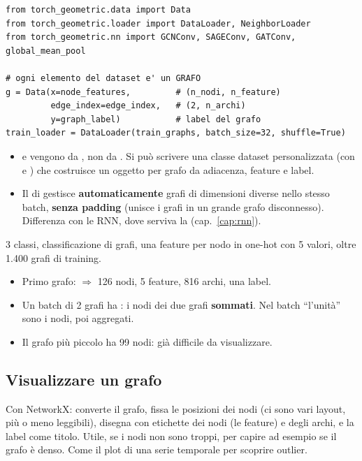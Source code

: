 \begin{lstlisting}
from torch_geometric.data import Data
from torch_geometric.loader import DataLoader, NeighborLoader
from torch_geometric.nn import GCNConv, SAGEConv, GATConv, global_mean_pool

# ogni elemento del dataset e' un GRAFO
g = Data(x=node_features,         # (n_nodi, n_feature)
         edge_index=edge_index,   # (2, n_archi)
         y=graph_label)           # label del grafo
train_loader = DataLoader(train_graphs, batch_size=32, shuffle=True)
\end{lstlisting}
\begin{itemize}
  \item {} e  vengono da \textbf{}, non da . Si può scrivere una classe dataset
        personalizzata (con  e ) che costruisce un oggetto  per grafo da adiacenza, feature e label.
  \item Il  di  gestisce \textbf{automaticamente} grafi di dimensioni diverse nello stesso batch,
        \textbf{senza padding} (unisce i grafi in un grande grafo disconnesso). Differenza con le RNN, dove serviva la 
        (cap.~\ref{cap:rnn}).
\end{itemize}

\begin{esempio}
3 classi, classificazione di grafi, una feature per nodo in one-hot con 5 valori, oltre 1.400 grafi di training.
\begin{itemize}
  \item Primo grafo:  $\Rightarrow$ 126 nodi, 5 feature, 816 archi, una label.
  \item Un batch di 2 grafi ha : i nodi dei due grafi \textbf{sommati}. Nel batch ``l'unità'' sono i nodi, poi aggregati.
  \item Il grafo più piccolo ha 99 nodi: già difficile da visualizzare.
\end{itemize}
\end{esempio}

\subsection{Visualizzare un grafo}
Con NetworkX:  converte il grafo,  fissa le posizioni dei nodi (ci sono vari layout, più o meno
leggibili),  disegna con etichette dei nodi (le feature) e degli archi, e la label come titolo. Utile, se i nodi non sono
troppi, per capire ad esempio se il grafo è denso. Come il plot di una serie temporale per scoprire outlier.

